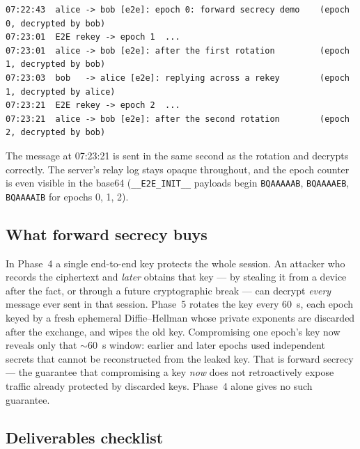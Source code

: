 \documentclass[11pt,a4paper]{article}
\begin{document}
\begin{lstlisting}
07:22:43  alice -> bob [e2e]: epoch 0: forward secrecy demo    (epoch 0, decrypted by bob)
07:23:01  E2E rekey -> epoch 1  ...
07:23:01  alice -> bob [e2e]: after the first rotation         (epoch 1, decrypted by bob)
07:23:03  bob   -> alice [e2e]: replying across a rekey        (epoch 1, decrypted by alice)
07:23:21  E2E rekey -> epoch 2  ...
07:23:21  alice -> bob [e2e]: after the second rotation        (epoch 2, decrypted by bob)
\end{lstlisting}

The message at 07:23:21 is sent in the same second as the rotation and decrypts correctly. The
server's relay log stays opaque throughout, and the epoch counter is even visible in the base64
(\texttt{\_\_E2E\_INIT\_\_} payloads begin \texttt{BQAAAAAB}, \texttt{BQAAAAEB}, \texttt{BQAAAAIB} for
epochs 0, 1, 2).

\subsection{What forward secrecy buys}

In Phase~4 a single end-to-end key protects the whole session. An attacker who records the ciphertext
and \emph{later} obtains that key --- by stealing it from a device after the fact, or through a future
cryptographic break --- can decrypt \emph{every} message ever sent in that session. Phase~5 rotates
the key every 60~s, each epoch keyed by a fresh ephemeral Diffie--Hellman whose private exponents are
discarded after the exchange, and wipes the old key. Compromising one epoch's key now reveals only
that $\sim$60~s window: earlier and later epochs used independent secrets that cannot be reconstructed
from the leaked key. That is forward secrecy --- the guarantee that compromising a key \emph{now} does
not retroactively expose traffic already protected by discarded keys. Phase~4 alone gives no such
guarantee.

\subsection{Deliverables checklist}
\end{document}
